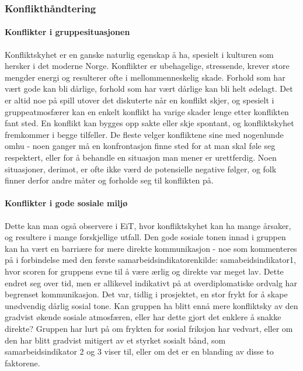 \subsubsection{Konflikthåndtering}

\paragraph{Konflikter i gruppesituasjonen}
Konfliktskyhet er en ganske naturlig egenskap å ha, spesielt i kulturen som hersker i det moderne Norge. Konflikter er ubehagelige, stressende, krever store mengder energi og resulterer ofte i mellommenneskelig skade. Forhold som har vært gode kan bli dårlige, forhold som har vært dårlige kan bli helt ødelagt. Det er altid noe på spill utover det diskuterte når en konflikt skjer, og spesielt i gruppeatmosfærer kan en enkelt konflikt ha varige skader lenge etter konflikten fant sted. En konflikt kan bygges opp sakte eller skje spontant, og konfliktskyhet fremkommer i begge tilfeller. De fleste velger konfliktene sine med nogenlunde omhu - noen ganger må en konfrontasjon finne sted for at man skal føle seg respektert, eller for å behandle en situasjon man mener er urettferdig. Noen situasjoner, derimot, er ofte ikke værd de potensielle negative følger, og folk finner derfor andre måter og forholde seg til konflikten på. 

\paragraph{Konflikter i gode sosiale miljø}
Dette kan man også observere i EiT, hvor konfliktskyhet kan ha mange årsaker, og resultere i mange forskjellige utfall. Den gode sosiale tonen innad i gruppen kan ha vært en barriære for mere direkte kommunikasjon - noe som kommenteres på i forbindelse med den første samarbeidsindikatoren{kilde: samabeidsindikator1}, hvor scoren for gruppens evne til å være ærlig og direkte var meget lav. Dette endret seg over tid, men er allikevel indikativt på at overdiplomatiske ordvalg har begrenset kommunikasjon. Det var, tidlig i prosjektet, en stor frykt for å skape unødvendig dårlig sosial tone. Kan gruppen ha blitt ennå mere konfliktsky av den gradvist økende sosiale atmosfæren, eller har dette gjort det enklere å snakke direkte? Gruppen har lurt på om frykten for sosial friksjon har vedvart, eller om den har blitt gradvist mitigert av et styrket sosialt bånd, som samarbeidsindikator 2 og 3 viser til, eller om det er en blanding av disse to faktorene. 

